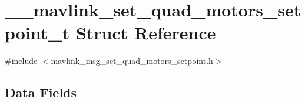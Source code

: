 \hypertarget{struct____mavlink__set__quad__motors__setpoint__t}{\section{\-\_\-\-\_\-mavlink\-\_\-set\-\_\-quad\-\_\-motors\-\_\-setpoint\-\_\-t Struct Reference}
\label{struct____mavlink__set__quad__motors__setpoint__t}
}


{\ttfamily \#include $<$mavlink\-\_\-msg\-\_\-set\-\_\-quad\-\_\-motors\-\_\-setpoint.\-h$>$}

\subsection*{Data Fields}
